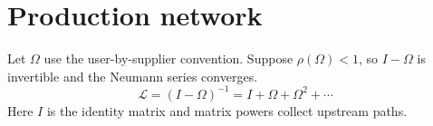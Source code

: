 \documentclass{article}
\begin{document}
\section{Production network}
Let $\Omega$ use the user-by-supplier convention. Suppose $\rho(\Omega)<1$,
so $I-\Omega$ is invertible and the Neumann series converges.
\begin{equation}
  \mathcal L=(I-\Omega)^{-1}=I+\Omega+\Omega^2+\cdots
  \label{eq:leontief}
\end{equation}
Here $I$ is the identity matrix and matrix powers collect upstream paths.
\end{document}

